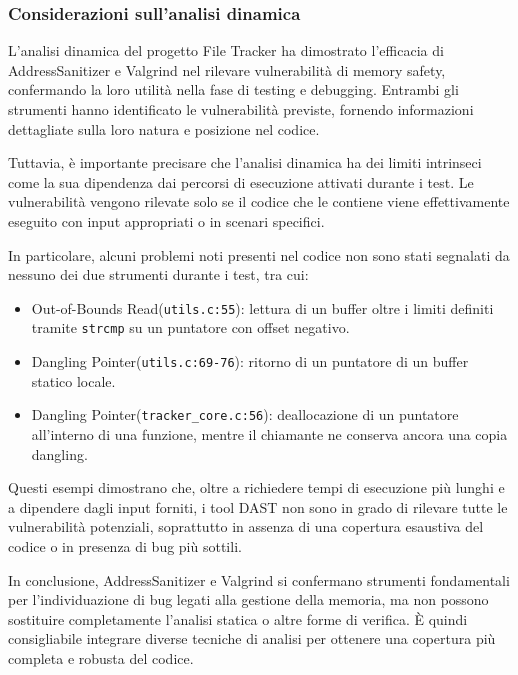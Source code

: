 \subsubsection*{Considerazioni sull'analisi dinamica}
L'analisi dinamica del progetto File Tracker ha dimostrato l'efficacia di AddressSanitizer
e Valgrind nel rilevare vulnerabilità di memory safety, confermando la loro
utilità nella fase di testing e debugging. Entrambi gli strumenti hanno identificato
le vulnerabilità previste, fornendo informazioni dettagliate sulla loro natura e
posizione nel codice.

Tuttavia, è importante precisare che l'analisi dinamica ha dei limiti intrinseci
come la sua dipendenza dai percorsi di esecuzione attivati durante i test. Le
vulnerabilità vengono rilevate solo se il codice che le contiene viene
effettivamente eseguito con input appropriati o in scenari specifici.

In particolare, alcuni problemi noti presenti nel codice non sono stati segnalati
da nessuno dei due strumenti durante i test, tra cui:
\begin{itemize}
  \item Out-of-Bounds Read(\texttt{utils.c:55}): lettura di un buffer oltre i
    limiti definiti tramite \texttt{strcmp} su un puntatore con offset negativo.

  \item Dangling Pointer(\texttt{utils.c:69-76}): ritorno di un puntatore di un
    buffer statico locale.

  \item Dangling Pointer(\texttt{tracker\_core.c:56}): deallocazione di un
    puntatore all'interno di una funzione, mentre il chiamante ne conserva ancora
    una copia dangling.
\end{itemize}

Questi esempi dimostrano che, oltre a richiedere tempi di esecuzione più lunghi e
a dipendere dagli input forniti, i tool DAST non sono in grado di rilevare tutte
le vulnerabilità potenziali, soprattutto in assenza di una copertura esaustiva del
codice o in presenza di bug più sottili.

In conclusione, AddressSanitizer e Valgrind si confermano strumenti fondamentali
per l'individuazione di bug legati alla gestione della memoria, ma non possono sostituire
completamente l'analisi statica o altre forme di verifica. È quindi
consigliabile integrare diverse tecniche di analisi per ottenere una copertura
più completa e robusta del codice.